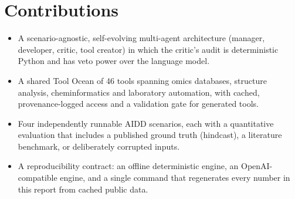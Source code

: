 \section{Contributions}

\begin{itemize}
\setlength{\itemsep}{0pt}\setlength{\parskip}{0pt}
\item A scenario-agnostic, self-evolving multi-agent architecture (manager, developer, critic, tool creator) in which the critic's audit is deterministic Python and has veto power over the language model.
\item A shared Tool Ocean of 46 tools spanning omics databases, structure analysis, cheminformatics and laboratory automation, with cached, provenance-logged access and a validation gate for generated tools.
\item Four independently runnable AIDD scenarios, each with a quantitative evaluation that includes a published ground truth (hindcast), a literature benchmark, or deliberately corrupted inputs.
\item A reproducibility contract: an offline deterministic engine, an OpenAI-compatible engine, and a single command that regenerates every number in this report from cached public data.
\end{itemize}

